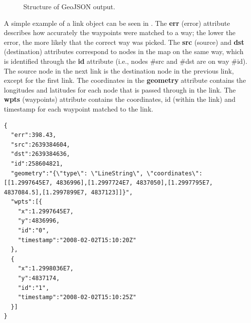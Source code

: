 \begin{figure}[H]
	\centering
	\caption{Structure of GeoJSON output.}
	\label{fig:geojson}
\end{figure}

A simple example of a link object can be seen in . The \textbf{err} (error) attribute describes how accurately the waypoints were matched to a way; the lower the error, the more likely that the correct way was picked. The \textbf{src} (source) and \textbf{dst} (destination) attributes correspond to nodes in the map on the same way, which is identified through the \textbf{id} attribute (i.e., nodes \#src and \#dst are on way \#id). The source node in the next link is the destination node in the previous link, except for the first link. The coordinates in the \textbf{geometry} attribute contains the longitudes and latitudes for each node that is passed through in the link. The \textbf{wpts} (waypoints) attribute contains the coordinates, id (within the link) and timestamp for each waypoint matched to the link. 

\begin{lstlisting}[style=java, caption=Content of a simple link object., label=lst:geojson:link]
{
  "err":398.43,
  "src":2639384604,
  "dst":2639384636,
  "id":258604821,
  "geometry":"{\"type\": \"LineString\", \"coordinates\": [[1.2997645E7, 4836996],[1.2997724E7, 4837050],[1.2997795E7, 4837084.5],[1.2997899E7, 4837123]]}",
  "wpts":[{
    "x":1.2997645E7,
    "y":4836996,
    "id":"0",
    "timestamp":"2008-02-02T15:10:20Z"
  },
  {
    "x":1.2998036E7,
    "y":4837174,
    "id":"1",
    "timestamp":"2008-02-02T15:10:25Z"
  }]
}
\end{lstlisting}

